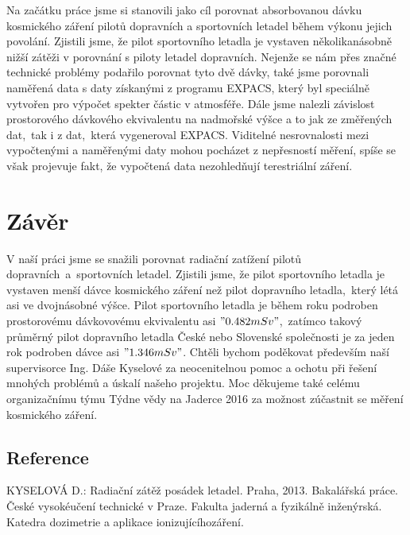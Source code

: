 \documentclass[11pt,a4paper]{article}
\begin{document}
\begin{center}
\end{center}
Na začátku práce jsme si stanovili jako cíl porovnat absorbovanou dávku
kosmického záření pilotů dopravních a sportovních letadel během výkonu jejich
povolání. Zjistili jsme, že pilot sportovního letadla je vystaven
několikanásobně nižší zátěži v porovnání s piloty letadel dopravních. Nejenže se
nám přes značné technické problémy podařilo porovnat tyto dvě dávky, také jsme
porovnali naměřená data s daty získanými z programu EXPACS, který byl speciálně
vytvořen pro výpočet spekter částic v atmosféře. Dále jsme nalezli závislost
prostorového dávkového ekvivalentu na nadmořské výšce a to jak ze změřených
dat,~tak i z dat,~která vygeneroval EXPACS. Viditelné nesrovnalosti mezi
vypočtenými a naměřenými daty mohou pocházet z nepřesností měření, spíše se
však projevuje fakt, že vypočtená data nezohledňují terestriální záření.\newpage

\section*{Závěr}
V naší práci jsme se snažili porovnat radiační zatížení pilotů
dopravních~a~sportovních letadel. Zjistili jsme, že pilot sportovního letadla je
vystaven menší dávce kosmického záření než pilot dopravního letadla,~který létá
asi ve dvojnásobné výšce. Pilot sportovního letadla je během roku podroben
prostorovému dávkovovému ekvivalentu asi $"0.482 mSv" $,~zatímco takový průměrný
pilot dopravního letadla České nebo Slovenské společnosti je za jeden rok
podroben dávce asi $"1.346 mSv"$.
Chtěli bychom poděkovat především naší supervisorce Ing. Dáše Kyselové za
neocenitelnou pomoc a ochotu při řešení mnohých problémů a úskalí našeho
projektu. Moc děkujeme také celému organizačnímu týmu Týdne vědy na Jaderce
2016 za možnost zúčastnit se měření kosmického záření.
\subsection*{Reference}
\begin{thebibliography}{99}
KYSELOVÁ D.: Radiační zátěž posádek letadel. Praha, 2013. Bakalářská práce. České vysokéučení technické v Praze. Fakulta jaderná a fyzikálně inženýrská. Katedra dozimetrie a aplikace ionizujícíhozáření.
\end{thebibliography}
\end{document}
